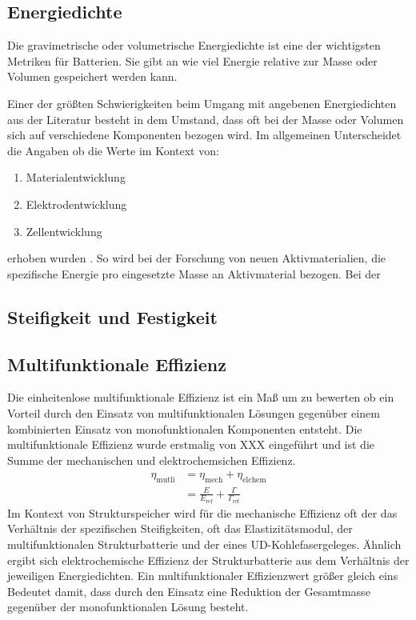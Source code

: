 \subsection{Energiedichte}
Die gravimetrische oder volumetrische Energiedichte ist eine der wichtigsten Metriken für Batterien. Sie gibt an wie viel Energie relative zur Masse oder Volumen gespeichert werden kann. 

Einer der größten Schwierigkeiten beim Umgang mit angebenen Energiedichten aus der Literatur besteht in dem Umstand, dass oft bei der Masse oder Volumen sich auf verschiedene Komponenten bezogen wird. Im allgemeinen Unterscheidet die Angaben ob die Werte im Kontext von:
\begin{enumerate}
	\item Materialentwicklung
	\item Elektrodentwicklung
	\item Zellentwicklung
\end{enumerate}
erhoben wurden \cite{Son2021}.
So wird bei der Forschung von neuen Aktivmaterialien, die spezifische Energie pro eingesetzte Masse an Aktivmaterial bezogen. Bei der 

\subsection{Steifigkeit und Festigkeit}
\subsection{Multifunktionale Effizienz}

Die einheitenlose multifunktionale Effizienz ist ein Maß um zu bewerten ob ein Vorteil durch den Einsatz von multifunktionalen Lösungen gegenüber einem kombinierten Einsatz von monofunktionalen Komponenten entsteht.
Die multifunktionale Effizienz wurde erstmalig von XXX eingeführt und ist die Summe der mechanischen  und elektrochemsichen Effizienz.
\begin{align}
	\eta_{\text{mutli}} &= \eta_{\text{mech}} + \eta_{\text{elchem}}\\
						&= \frac{E}{E_{\text{ref}}} + \frac{\Gamma}{\Gamma_\text{ref}} 
\end{align}
Im Kontext von Strukturspeicher wird für die mechanische Effizienz oft der das Verhältnis der spezifischen Steifigkeiten, oft das Elastizitätsmodul, der multifunktionalen Strukturbatterie und der eines UD-Kohlefasergeleges. Ähnlich ergibt sich elektrochemische Effizienz der Strukturbatterie aus dem Verhältnis der jeweiligen Energiedichten. Ein multifunktionaler Effizienzwert größer gleich eins Bedeutet damit, dass durch den Einsatz eine Reduktion der Gesamtmasse gegenüber der monofunktionalen Lösung besteht.

